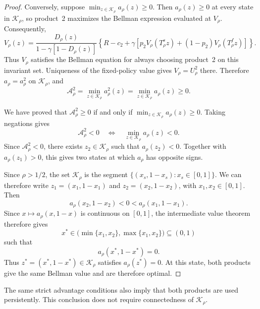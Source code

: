 \documentclass[11pt]{article}
\begin{document}
\begin{proof}
Conversely, suppose $\min_{z\in\mathcal K_\rho}a_\rho(z)\geq0$.
Then $a_\rho(z)\geq0$ at every state in $\mathcal K_\rho$, so
product~2 maximizes the Bellman expression evaluated at $V_\rho$.
Consequently,
\begin{equation*}
V_\rho(z)
=\frac{D_\rho(z)}{1-\gamma[1-D_\rho(z)]}
\left\{R-c_2+\gamma\left[p_2V_\rho(T_\rho^s z)
+(1-p_2)V_\rho(T_\rho^f z)\right]\right\}.
\end{equation*}
Thus $V_\rho$ satisfies the Bellman equation for always choosing
product~2 on this invariant set. Uniqueness of the fixed-policy value
gives $V_\rho=U_\rho^2$ there. Therefore $a_\rho=a_\rho^2$ on
$\mathcal K_\rho$, and
\begin{equation*}
\mathcal A_\rho^2
=\min_{z\in\mathcal K_\rho}a_\rho^2(z)
=\min_{z\in\mathcal K_\rho}a_\rho(z)\geq0.
\end{equation*}

We have proved that $\mathcal A_\rho^2\geq0$ if and only if
$\min_{z\in\mathcal K_\rho}a_\rho(z)\geq0$. Taking negations gives
\begin{equation*}
\mathcal A_\rho^2<0
\quad\Longleftrightarrow\quad
\min_{z\in\mathcal K_\rho}a_\rho(z)<0.
\end{equation*}
Since $\mathcal A_\rho^2<0$, there exists $z_2\in\mathcal K_\rho$
such that $a_\rho(z_2)<0$. Together with $a_\rho(z_1)>0$, this gives
two states at which $a_\rho$ has opposite signs.

Since $\rho>1/2$, the set $\mathcal K_\rho$ is the segment
$\{(x_s,1-x_s):x_s\in[0,1]\}$. We can therefore write
$z_1=(x_1,1-x_1)$ and $z_2=(x_2,1-x_2)$, with $x_1,x_2\in[0,1]$.
Then
\begin{equation*}
a_\rho(x_2,1-x_2)<0<a_\rho(x_1,1-x_1).
\end{equation*}
Since $x\mapsto a_\rho(x,1-x)$ is continuous on $[0,1]$,
the intermediate value theorem therefore gives
\begin{equation*}
x^*\in\bigl(\min\{x_1,x_2\},\max\{x_1,x_2\}\bigr)\subseteq(0,1)
\end{equation*}
such that
\begin{equation*}
a_\rho(x^*,1-x^*)=0.
\end{equation*}
Thus $z^*=(x^*,1-x^*)\in\mathcal K_\rho$ satisfies $a_\rho(z^*)=0$.
At this state, both products give the same Bellman value and are
therefore optimal.
\end{proof}

The same strict advantage conditions also imply that both products
are used persistently. This conclusion does not require
connectedness of $\mathcal K_\rho$.
\end{document}
